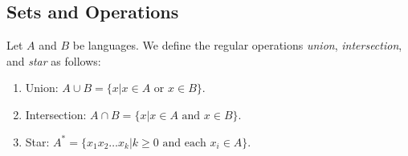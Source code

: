%

\subsection{Sets and Operations}
	\begin{definition}
	Let $A$ and $B$ be languages. We define the regular operations \emph{union}, \emph{intersection}, and \emph{star}
	as follows:
	\begin{enumerate}
		\item Union: $ A \cup B = \{ x \vert x \in A \text{ or } x \in B \} $.
		 \item Intersection:  $ A \cap B = \{ x \vert x \in A \text{ and } x \in B \} $.
		\item Star:  $ A^* = \{ x_1x_2\dots x_k \vert k \geq 0 \text{ and each } x_i \in A \} $.
	\end{enumerate}
	\end{definition}

